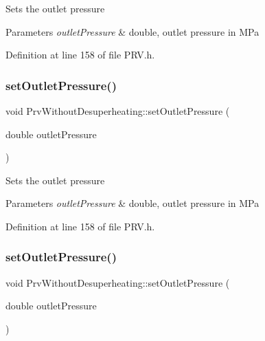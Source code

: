 Sets the outlet pressure


\begin{DoxyParams}{Parameters}
{\em outlet\+Pressure} & double, outlet pressure in M\+Pa \\
\hline
\end{DoxyParams}


Definition at line 158 of file P\+R\+V.\+h.

\mbox{\label{class_prv_without_desuperheating_a0f2a4597b58390e5c4a7c75b38bbebbc}} 
\subsubsection{\texorpdfstring{set\+Outlet\+Pressure()}{setOutletPressure()}\hspace{0.1cm}{\footnotesize\ttfamily [2/3]}}
{\footnotesize\ttfamily void Prv\+Without\+Desuperheating\+::set\+Outlet\+Pressure (\begin{DoxyParamCaption}\item[{double}]{outlet\+Pressure }\end{DoxyParamCaption})\hspace{0.3cm}{\ttfamily [inline]}}

Sets the outlet pressure


\begin{DoxyParams}{Parameters}
{\em outlet\+Pressure} & double, outlet pressure in M\+Pa \\
\hline
\end{DoxyParams}


Definition at line 158 of file P\+R\+V.\+h.

\mbox{\label{class_prv_without_desuperheating_a0f2a4597b58390e5c4a7c75b38bbebbc}} 
\subsubsection{\texorpdfstring{set\+Outlet\+Pressure()}{setOutletPressure()}\hspace{0.1cm}{\footnotesize\ttfamily [3/3]}}
{\footnotesize\ttfamily void Prv\+Without\+Desuperheating\+::set\+Outlet\+Pressure (\begin{DoxyParamCaption}\item[{double}]{outlet\+Pressure }\end{DoxyParamCaption})\hspace{0.3cm}{\ttfamily [inline]}}

